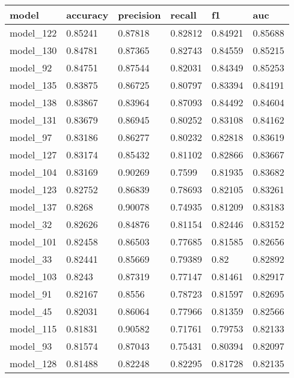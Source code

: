 \begin{tabular}{|l|l|l|l|l|l|}
\hline
\textbf{model} & \textbf{accuracy} & \textbf{precision} & \textbf{recall} & \textbf{f1} & \textbf{auc} \\ \hline
model\_122     & 0.85241           & 0.87818            & 0.82812         & 0.84921     & 0.85688      \\ \hline
model\_130     & 0.84781           & 0.87365            & 0.82743         & 0.84559     & 0.85215      \\ \hline
model\_92      & 0.84751           & 0.87544            & 0.82031         & 0.84349     & 0.85253      \\ \hline
model\_135     & 0.83875           & 0.86725            & 0.80797         & 0.83394     & 0.84191      \\ \hline
model\_138     & 0.83867           & 0.83964            & 0.87093         & 0.84492     & 0.84604      \\ \hline
model\_131     & 0.83679           & 0.86945            & 0.80252         & 0.83108     & 0.84162      \\ \hline
model\_97      & 0.83186           & 0.86277            & 0.80232         & 0.82818     & 0.83619      \\ \hline
model\_127     & 0.83174           & 0.85432            & 0.81102         & 0.82866     & 0.83667      \\ \hline
model\_104     & 0.83169           & 0.90269            & 0.7599          & 0.81935     & 0.83682      \\ \hline
model\_123     & 0.82752           & 0.86839            & 0.78693         & 0.82105     & 0.83261      \\ \hline
model\_137     & 0.8268            & 0.90078            & 0.74935         & 0.81209     & 0.83183      \\ \hline
model\_32      & 0.82626           & 0.84876            & 0.81154         & 0.82446     & 0.83152      \\ \hline
model\_101     & 0.82458           & 0.86503            & 0.77685         & 0.81585     & 0.82656      \\ \hline
model\_33      & 0.82441           & 0.85669            & 0.79389         & 0.82        & 0.82892      \\ \hline
model\_103     & 0.8243            & 0.87319            & 0.77147         & 0.81461     & 0.82917      \\ \hline
model\_91      & 0.82167           & 0.8556             & 0.78723         & 0.81597     & 0.82695      \\ \hline
model\_45      & 0.82031           & 0.86064            & 0.77966         & 0.81359     & 0.82566      \\ \hline
model\_115     & 0.81831           & 0.90582            & 0.71761         & 0.79753     & 0.82133      \\ \hline
model\_93      & 0.81574           & 0.87043            & 0.75431         & 0.80394     & 0.82097      \\ \hline
model\_128     & 0.81488           & 0.82248            & 0.82295         & 0.81728     & 0.82135      \\ \hline
\end{tabular}